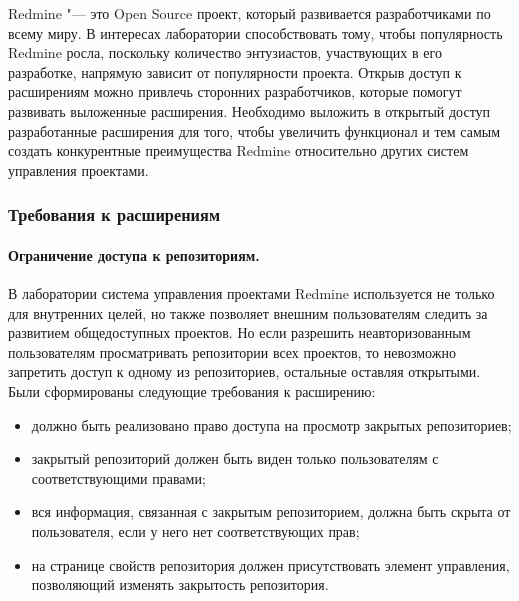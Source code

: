 Redmine "--- это Open Source проект, который развивается разработчиками по
всему миру. В интересах лаборатории способствовать тому, чтобы популярность
Redmine росла, поскольку количество энтузиастов, участвующих в его разработке,
напрямую зависит от популярности проекта. Открыв доступ к расширениям можно
привлечь сторонних разработчиков, которые помогут развивать выложенные
расширения. Необходимо выложить в открытый доступ разработанные расширения для
того, чтобы увеличить функционал и тем самым создать конкурентные преимущества
Redmine относительно других систем управления проектами.

\subsubsection{Требования к расширениям}

\paragraph{Ограничение доступа к репозиториям.}
\label{definiton:private_repository}
В лаборатории система управления проектами Redmine используется не только для
внутренних целей, но также позволяет внешним пользователям следить за развитием
общедоступных проектов. Но если разрешить неавторизованным пользователям
просматривать репозитории всех проектов, то невозможно запретить доступ к
одному из репозиториев, остальные оставляя открытыми. Были сформированы
следующие требования к расширению:
\begin{itemize}
  \item должно быть реализовано право доступа на просмотр закрытых
  репозиториев;
  \item закрытый репозиторий должен быть виден только пользователям с
  соответствующими правами;  
  \item вся информация, связанная с закрытым репозиторием, должна быть скрыта
  от пользователя, если у него нет соответствующих прав;
  \item на странице свойств репозитория должен присутствовать элемент
  управления, позволяющий изменять закрытость репозитория.
\end{itemize}


